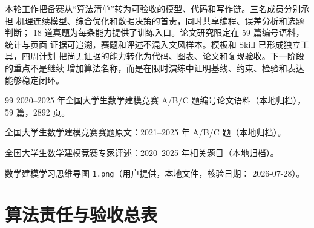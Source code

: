 \documentclass[UTF8,a4paper,12pt]{ctexart}
\begin{document}
{本轮工作把备赛从“算法清单”转为可验收的模型、代码和写作链。三名成员分别承担
机理连续模型、综合优化和数据决策的首责，同时共享编程、误差分析和选题判断；
18 道真题为每条能力提供了训练入口。论文研究限定在 59 篇编号语料，统计与页面
证据可追溯，赛题和评述不混入文风样本。模板和 Skill 已形成独立工具，四周计划
把尚无证据的能力转化为代码、图表、论文和复现验收。下一阶段的重点不是继续
增加算法名称，而是在限时演练中证明基线、约束、检验和表达能够稳定闭环。

\begin{thebibliography}{99}
2020--2025 年全国大学生数学建模竞赛 A/B/C 题编号论文语料（本地归档），
59 篇，2892 页。

全国大学生数学建模竞赛赛题原文：2021--2025 年 A/B/C 题（本地归档）。

全国大学生数学建模竞赛专家评述：2020--2025 年相关题目（本地归档）。

数学建模学习思维导图 \texttt{1.png}（用户提供，本地文件，核验日期：
2026-07-28）。
\end{thebibliography}

\appendix
\section{算法责任与验收总表}

}
\end{document}

